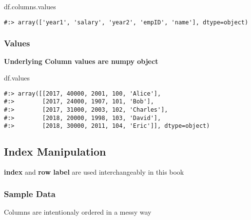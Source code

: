 \documentclass[
]{book}
\newenvironment{Shaded}{\begin{snugshade}}{\end{snugshade}}
\newcommand{\NormalTok}[1]{#1}
\begin{document}
\begin{Shaded}
\begin{Highlighting}[]
\NormalTok{df.columns.values}
\end{Highlighting}
\end{Shaded}

\begin{verbatim}
#:> array(['year1', 'salary', 'year2', 'empID', 'name'], dtype=object)
\end{verbatim}

\hypertarget{values}{%
\subsubsection{Values}\label{values}}

\textbf{Underlying Column values are numpy object}

\begin{Shaded}
\begin{Highlighting}[]
\NormalTok{df.values}
\end{Highlighting}
\end{Shaded}

\begin{verbatim}
#:> array([[2017, 40000, 2001, 100, 'Alice'],
#:>        [2017, 24000, 1907, 101, 'Bob'],
#:>        [2017, 31000, 2003, 102, 'Charles'],
#:>        [2018, 20000, 1998, 103, 'David'],
#:>        [2018, 30000, 2011, 104, 'Eric']], dtype=object)
\end{verbatim}

\hypertarget{index-manipulation-1}{%
\subsection{Index Manipulation}\label{index-manipulation-1}}

\textbf{index} and \textbf{row label} are used interchangeably in this book

\hypertarget{sample-data-6}{%
\subsubsection{Sample Data}\label{sample-data-6}}

Columns are intentionaly ordered in a messy way
\end{document}

